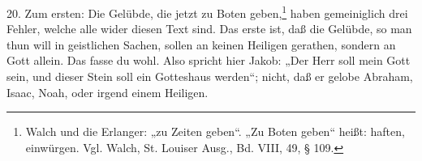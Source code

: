 20. Zum ersten: Die Gelübde, die jetzt zu Boten geben,\footnote{Walch und die Erlanger: „zu Zeiten geben“. „Zu Boten geben“ heißt: haften, einwürgen. Vgl. Walch, St. Louiser Ausg., Bd. VIII, 49, § 109.} haben gemeiniglich drei Fehler, welche alle wider diesen Text sind. Das erste ist, daß die Gelübde, so man thun will in geistlichen Sachen, sollen an keinen Heiligen gerathen, sondern an Gott allein. Das fasse du wohl. Also spricht hier Jakob: „Der Herr soll mein Gott sein, und dieser Stein soll ein Gotteshaus werden“; nicht, daß er gelobe Abraham, Isaac, Noah, oder irgend einem Heiligen.
